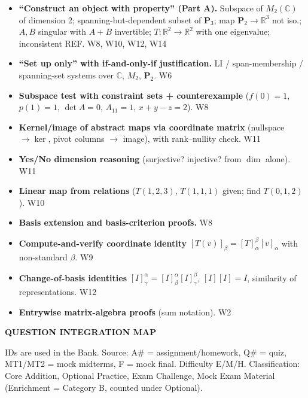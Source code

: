 \documentclass[9pt]{article}
\newcommand{\secn}[1]{\vspace{5pt}\par\noindent\begin{tcolorbox}[colback=NAVY,colframe=NAVY,boxrule=0pt,arc=2pt,left=5pt,top=1pt,bottom=1pt]\color{white}\bfseries\MakeUppercase{#1}\end{tcolorbox}\nopagebreak}
\begin{document}
\begin{itemize}[leftmargin=1.2em,itemsep=0pt,topsep=1pt]
\item \textbf{``Construct an object with property'' (Part A).} Subspace of $M_2(\mathbb C)$ of dimension 2; spanning-but-dependent subset of $\mathbf P_3$; map $\mathbf P_2\to\mathbb R^3$ not iso.; $A,B$ singular with $A+B$ invertible; $T:\mathbb R^2\to\mathbb R^2$ with one eigenvalue; inconsistent REF. \hfill W8, W10, W12, W14
\item \textbf{``Set up only'' with if-and-only-if justification.} LI / span-membership / spanning-set systems over $\mathbb C$, $M_2$, $\mathbf P_2$. \hfill W6
\item \textbf{Subspace test with constraint sets + counterexample} ($f(0)=1$, $p(1)=1$, $\det A=0$, $A_{11}=1$, $x+y-z=2$). \hfill W8
\item \textbf{Kernel/image of abstract maps via coordinate matrix} (nullspace $\to\ker$, pivot columns $\to$ image), with rank--nullity check. \hfill W11
\item \textbf{Yes/No dimension reasoning} (surjective? injective? from $\dim$ alone). \hfill W11
\item \textbf{Linear map from relations} ($T(1,2,3)$, $T(1,1,1)$ given; find $T(0,1,2)$). \hfill W10
\item \textbf{Basis extension and basis-criterion proofs.} \hfill W8
\item \textbf{Compute-and-verify coordinate identity} $[T(v)]_\beta=[T]_\alpha^\beta[v]_\alpha$ with non-standard $\beta$. \hfill W9
\item \textbf{Change-of-basis identities} $[I]^\alpha_\gamma=[I]^\alpha_\beta[I]^\beta_\gamma$, $[I][I]=I$, similarity of representations. \hfill W12
\item \textbf{Entrywise matrix-algebra proofs} (sum notation). \hfill W2
\end{itemize}
\secn{Question Integration Map}
IDs are used in the Bank. Source: A\# = assignment/homework, Q\# = quiz, MT1/MT2 = mock midterms, F = mock final. Difficulty E/M/H. Classification: Core Addition, Optional Practice, Exam Challenge, Mock Exam Material (Enrichment = Category B, counted under Optional).
\end{document}
